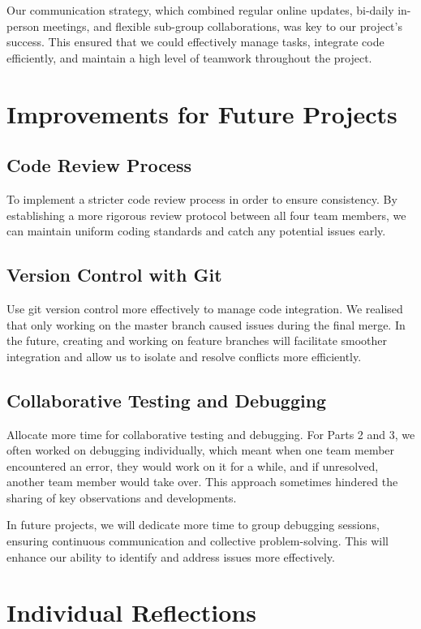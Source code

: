 \documentclass[9pt,a4paper,twoside]{tau-class/tau}
\begin{document}
    Our communication strategy, which combined regular online updates, bi-daily in-person meetings, and flexible sub-group collaborations, was key to our project's success. This ensured that we could effectively manage tasks, integrate code efficiently, and maintain a high level of teamwork throughout the project. 

    \section{Improvements for Future Projects} 

    \subsection{Code Review Process}
    To implement a stricter code review process in order to ensure consistency. By establishing a more rigorous review protocol between all four team members, we can maintain uniform coding standards and catch any potential issues early. 

    \subsection{Version Control with Git}
    Use git version control more effectively to manage code integration. We realised that only working on the master branch caused issues during the final merge. In the future, creating and working on feature branches will facilitate smoother integration and allow us to isolate and resolve conflicts more efficiently.   

    \subsection{Collaborative Testing and Debugging}
    Allocate more time for collaborative testing and debugging. For Parts 2 and 3, we often worked on debugging individually, which meant when one team member encountered an error, they would work on it for a while, and if unresolved, another team member would take over. This approach sometimes hindered the sharing of key observations and developments. 
    
    In future projects, we will dedicate more time to group debugging sessions, ensuring continuous communication and collective problem-solving. This will enhance our ability to identify and address issues more effectively.

    \section{Individual Reflections}    
    
\end{document}
